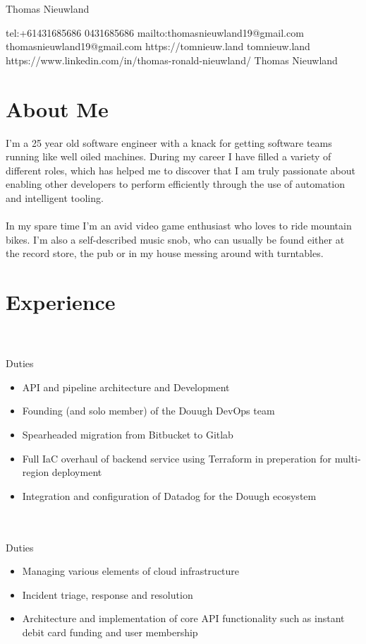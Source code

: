 \documentclass{resume}
\begin{document}
\ContactName
{Thomas Nieuwland}

\ContactInfoDigital
  {tel:+61431685686}
  {0431685686}
  {mailto:thomasnieuwland19@gmail.com}
  {thomasnieuwland19@gmail.com}
  {https://tomnieuw.land}
  {tomnieuw.land}
  {https://www.linkedin.com/in/thomas-ronald-nieuwland/}
  {Thomas Nieuwland}

\section{{\faUser} About Me}
I'm a 25 year old software engineer with a knack for getting software teams running like well oiled machines. During my 
career I have filled a variety of different roles, which has helped me to discover that I am truly passionate about 
enabling other developers to perform efficiently through the use of automation and intelligent tooling.
\\~\\
In my spare time I'm an avid video game enthusiast who loves to ride mountain bikes. I'm also a self-described music
snob, who can usually be found either at the record store, the pub or in my house messing around with turntables.

\section{{\faBriefcase} Experience}
 \\
 \\
Duties \\
\begin{itemize}
  \item API and pipeline architecture and Development
  \item Founding (and solo member) of the Douugh DevOps team
  \item Spearheaded migration from Bitbucket to Gitlab
  \item Full IaC overhaul of backend service using Terraform in preperation for multi-region deployment
  \item Integration and configuration of Datadog for the Douugh ecosystem
\end{itemize}

 \\
 \\
Duties \\
\begin{itemize}
  \item Managing various elements of cloud infrastructure
  \item Incident triage, response and resolution
  \item Architecture and implementation of core API functionality such as instant debit card funding and user membership
\end{itemize}
\end{document}

